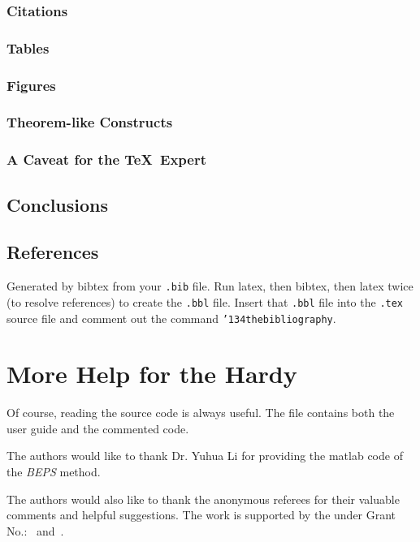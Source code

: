 \subsubsection{Citations}
\subsubsection{Tables}
\subsubsection{Figures}
\subsubsection{Theorem-like Constructs}
\subsubsection*{A Caveat for the \TeX\ Expert}
\subsection{Conclusions}
\subsection{References}
Generated by bibtex from your \texttt{.bib} file.  Run latex,
then bibtex, then latex twice (to resolve references)
to create the \texttt{.bbl} file.  Insert that \texttt{.bbl}
file into the \texttt{.tex} source file and comment out
the command \texttt{{\char'134}thebibliography}.
\section{More Help for the Hardy}

Of course, reading the source code is always useful.  The file
 contains both the user guide and the commented
code.

\begin{acks}
  The authors would like to thank Dr. Yuhua Li for providing the
  matlab code of  the \textit{BEPS} method. 

  The authors would also like to thank the anonymous referees for
  their valuable comments and helpful suggestions. The work is
  supported by the  under Grant
  No.:~
  and~.

\end{acks}
